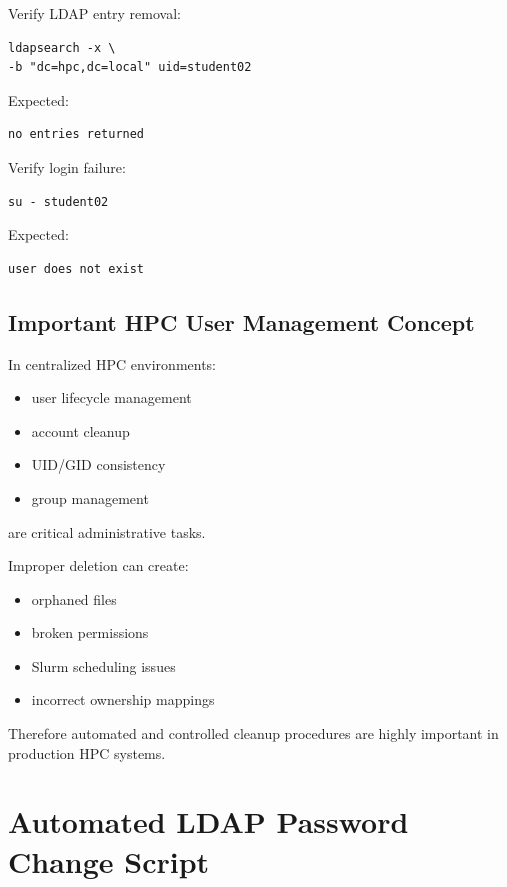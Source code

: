 \documentclass[11pt]{article}
\begin{document}
Verify LDAP entry removal:

\begin{verbatim}
ldapsearch -x \
-b "dc=hpc,dc=local" uid=student02
\end{verbatim}

Expected:

\begin{verbatim}
no entries returned
\end{verbatim}

Verify login failure:

\begin{verbatim}
su - student02
\end{verbatim}

Expected:

\begin{verbatim}
user does not exist
\end{verbatim}
\subsection{Important HPC User Management Concept}
\label{sec:org4e2e896}

In centralized HPC environments:

\begin{itemize}
\item user lifecycle management
\item account cleanup
\item UID/GID consistency
\item group management
\end{itemize}

are critical administrative tasks.

Improper deletion can create:

\begin{itemize}
\item orphaned files
\item broken permissions
\item Slurm scheduling issues
\item incorrect ownership mappings
\end{itemize}

Therefore automated and controlled cleanup procedures are highly important in production HPC systems.
\section{Automated LDAP Password Change Script}
\label{sec:orgac347dd}
\end{document}
